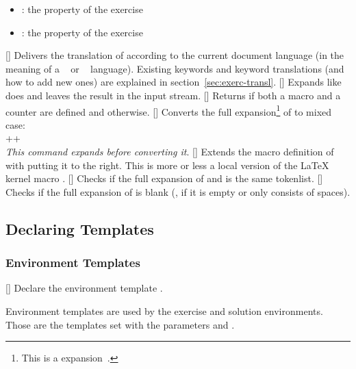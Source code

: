 \documentclass{xsim-manual}
\begin{document}
\begin{commands}
\begin{itemize}
      \item {}: the  property of the exercise
      \item {}: the  property of the exercise
    \end{itemize}
  \expandable{}[]
    Delivers the translation of  according to the current
    document language (in the meaning of a ~\cite{pkg:babel} or
    ~\cite{pkg:polyglossia} language).  Existing keywords and
    keyword translations (and how to add new ones) are explained in
    section~\vref{sec:exerc-transl}.
  []
    Expands  like  does and leaves the result in the
    input stream.
  \expandable{}[]
    Returns  if both a macro  and a counter
     are defined and  otherwise.
  []
    Converts the full expansion\footnote{This is a 
      expansion~\cite{texsx:romannumeral}.\label{fn:romannumeral}} of
     to mixed case: \\
    \verbcode++  \\
    \emph{This command expands  before converting it}.
  []
    Extends the macro definition of  with  putting it
    to the right.  This is more or less a local version of the LaTeX kernel
    macro .
  \expandable{}[]
    Checks if the full expansion of  and
     is the same tokenlist.
  \expandable{}[]
    Checks if the full expansion of  is
    blank (\ie, if it is empty or only consists of spaces). 
\end{commands}

\subsection{Declaring Templates}
\subsubsection{Environment Templates}\label{sec:envir-templ}
\begin{commands}
  []
    Declare the environment template .
\end{commands}
Environment templates are used by the exercise and solution environments.
Those are the templates set with the parameters 
and .
\end{document}
